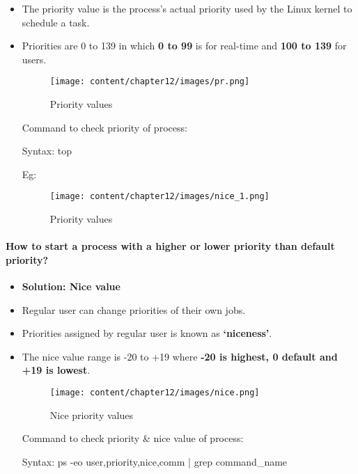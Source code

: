 \setlength{\columnsep}{3pt}
\begin{flushleft}


\begin{itemize}
	\item The priority value is the process’s actual priority used by the Linux kernel to schedule a task.
	\item Priorities are 0 to 139 in which \textbf{0 to 99} is for real-time and \textbf{100 to 139} for users.
	\begin{figure}[h!]
		\centering
		\texttt{[image: content/chapter12/images/pr.png]}
		\caption{Priority values}
		\label{fig:cpu5}
	\end{figure}

	Command to check priority of process:
	\bigskip
	\begin{tcolorbox}[breakable,notitle,boxrule=-0pt,colback=pink,colframe=pink]
		\color{black}
		\font=9pt
		Syntax: top
		\font=4pt
	\end{tcolorbox}	
	Eg:
	\begin{figure}[h!]
		\centering
		\texttt{[image: content/chapter12/images/nice\_1.png]}
		\caption{Priority values}
		\label{fig:cpu5}
	\end{figure}
		
	
\end{itemize}

\newpage

\paragraph{How to start a process with a higher or lower priority than default priority?}
\begin{itemize}
	\item \textbf{Solution: Nice value}
	\item Regular user can change priorities of their own jobs.
	\item Priorities assigned by regular user is known as \textbf{‘niceness’}.
	\item The nice value range is -20 to +19 where \textbf{-20 is highest, 0 default and +19 is lowest}.
	\begin{figure}[h!]
		\centering
		\texttt{[image: content/chapter12/images/nice.png]}
		\caption{Nice priority values}
		\label{fig:cpu58}
	\end{figure}
	
	Command to check priority \& nice value of process:
	\bigskip
	\begin{tcolorbox}[breakable,notitle,boxrule=-0pt,colback=pink,colframe=pink]
		\color{black}
		\font=9pt
		Syntax: ps -eo user,priority,nice,comm | grep command\_name
		\font=4pt
	\end{tcolorbox}	
	

\end{itemize}
\end{flushleft}
